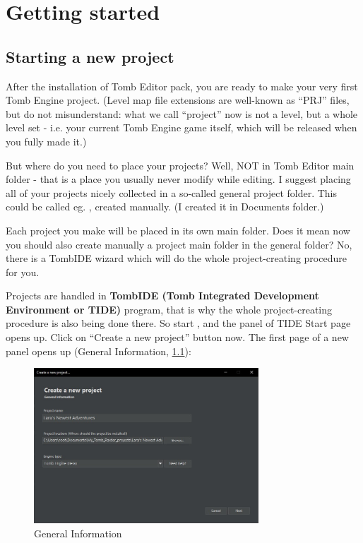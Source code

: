 
\part{Getting started}

\chapter{Starting a new project}
After the installation of Tomb Editor pack, you are ready to make your very first Tomb Engine project. (Level map file extensions are well-known as “PRJ” files, but do not misunderstand: what we call “project” now is not a level, but a whole level set - i.e. your current Tomb Engine game itself, which will be released when you fully made it.)
\par But where do you need to place your projects? Well, NOT in Tomb Editor main folder - that is a place you usually never modify while editing. I suggest placing all of your projects nicely collected in a so-called general project folder. This could be called eg. , created manually. (I created it in Documents folder.)
\par Each project you make will be placed in its own main folder. Does it mean now you should also create manually a project main folder in the general folder? No, there is a TombIDE wizard which will do the whole project-creating procedure for you.
\par Projects are handled in \textbf{TombIDE (Tomb Integrated Development Environment or TIDE)} program, that is why the whole project-creating procedure is also being done there.
So start , and the panel of TIDE Start page opens up.
Click on “Create a new project” button now.
The first page of a new panel opens up (General Information, \ref{fig:tide1}):
\begin{figure}
    \centering
     \includegraphics[width=0.75\textwidth]{screenshots/1.jpg}
     \caption{General Information}
     \label{fig:tide1}
\end{figure}

